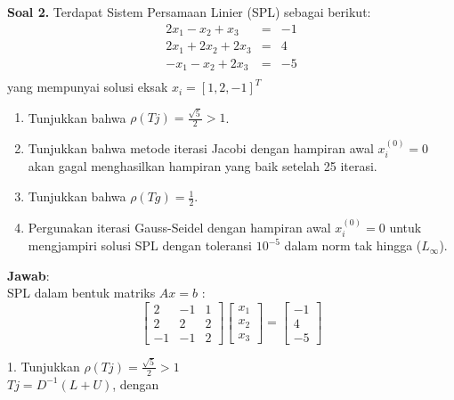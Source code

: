 \documentclass[paper=a4, fontsize=11pt]{scrartcl}
\numberwithin{equation}{section} %
\numberwithin{figure}{section} %
\numberwithin{table}{section} %
\begin{document}
\newpage
\large \textbf{Soal 2.}
Terdapat Sistem Persamaan Linier (SPL) sebagai berikut:
\begin{eqnarray}
	2x_{1} -  x_{2} +  x_{3} &=& -1 \nonumber \\
	2x_{1} + 2x_{2} + 2x_{3} &=&  4 \nonumber \\
	-x_{1} -  x_{2} + 2x_{3} &=& -5 \nonumber \\
\end{eqnarray}
yang mempunyai solusi eksak $x_{i} = [1, 2, -1]^T$\\
\begin{enumerate}
\item Tunjukkan bahwa $\rho(Tj) = \frac{\sqrt{5}}{2} > 1$.
\item Tunjukkan bahwa metode iterasi Jacobi dengan hampiran awal $x_{i}^{(0)} = 0$ akan gagal menghasilkan hampiran yang baik setelah 25 iterasi.
\item Tunjukkan bahwa $\rho(Tg) = \frac{1}{2}$.
\item Pergunakan iterasi Gauss-Seidel dengan hampiran awal $x_{i}^{(0)} = 0$ untuk mengjampiri solusi SPL dengan toleransi $10^{-5}$ dalam norm tak hingga ($L_{\infty}$).
\end{enumerate}
\textbf{Jawab}:\\
SPL dalam bentuk matriks $Ax = b$ :\\
\[
 \begin{bmatrix}
  2 & -1 & 1 \\
  2 &  2 & 2 \\
 -1 & -1 & 2
 \end{bmatrix}
 \begin{bmatrix}
  x_{1} \\
  x_{2} \\
  x_{3} 
 \end{bmatrix}
=
 \begin{bmatrix}
  -1 \\
  4 \\
  -5 
 \end{bmatrix}
\]

1. Tunjukkan $\rho(Tj) = \frac{\sqrt{5}}{2} > 1$\\

$Tj = D^{-1}(L + U)$, dengan\\
\end{document}
